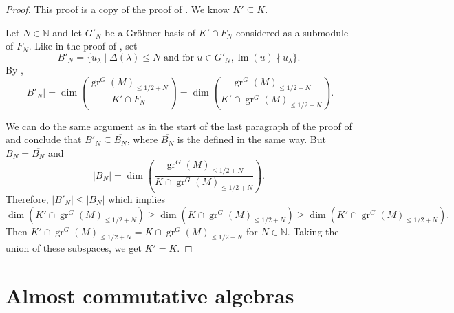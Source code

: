 \documentclass[a4paper, 12pt, reqno]{amsart}
\theoremstyle{remark}
\numberwithin{equation}{subsection}
\DeclareMathOperator{\gr}{gr}
\DeclareMathOperator{\lm}{lm}
\begin{document}
\begin{proof}
  This proof is a copy of the proof of .
  We know $K' \subseteq K$.

  Let $N \in \mathbb{N}$ and let $G'_N$ be a Gr\"{o}bner basis of $K' \cap F_N$ considered as a submodule of $F_N$.
  Like in the proof of , set
  \begin{equation*}
    B'_N = \{u_{\lambda} \mid \Delta(\lambda) \le N\text{ and for }u \in G'_N, \lm(u) \nmid u_{\lambda}\}.
  \end{equation*}
  By \cite[Proposition 3.6.4]{adams_introduction_1994},
  \begin{equation*}
    |B'_N| = \dim\left(\frac{\gr^G(M)_{\le 1/2 + N}}{K' \cap F_N}\right) = \dim\left(\frac{\gr^G(M)_{\le 1/2 + N}}{K' \cap \gr^G(M)_{\le 1/2 + N}}\right).
  \end{equation*}

  We can do the same argument as in the start of the last paragraph of the proof of  and conclude that $B'_N \subseteq \overline{B_N}$, where $\overline{B_N}$ is the defined in the same way.
  But $B_N = \overline{B_N}$ and
  \begin{equation*}
    |B_N| = \dim\left(\frac{\gr^G(M)_{\le 1/2 + N}}{K \cap \gr^G(M)_{\le 1/2 + N}}\right).
  \end{equation*}
  Therefore, $|B'_N| \le |B_N|$ which implies
  \begin{equation*}
    \dim(K' \cap \gr^G(M)_{\le 1/2 + N}) \ge \dim(K \cap \gr^G(M)_{\le 1/2 + N}) \ge \dim(K' \cap \gr^G(M)_{\le 1/2 + N}).
  \end{equation*}
  Then $K' \cap \gr^G(M)_{\le 1/2 + N} = K \cap \gr^G(M)_{\le 1/2 + N}$ for $N \in \mathbb{N}$.
  Taking the union of these subspaces, we get $K' = K$.
\end{proof}

\appendix
\section{Almost commutative algebras}
\label{sec:almost-comm-algebr}
\end{document}
